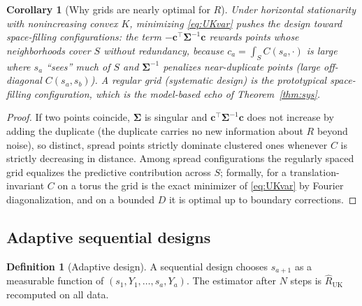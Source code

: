 \documentclass{amsart}
\newtheorem{corollary}[theorem]{Corollary}
\theoremstyle{definition}
\newtheorem{definition}[theorem]{Definition}
\newcommand{\Rhat}{\widehat R}
\begin{document}
\begin{corollary}[Why grids are nearly optimal for $R$]
Under horizontal stationarity with nonincreasing convex $K$, minimizing
\eqref{eq:UKvar} pushes the design toward \emph{space-filling}
configurations: the term $-\mathbf c^\top\boldsymbol\Sigma^{-1}\mathbf c$
rewards points whose neighborhoods cover $S$ without redundancy, because
$c_a=\int_S C(s_a,\cdot)$ is large where $s_a$ ``sees'' much of $S$ and
$\boldsymbol\Sigma^{-1}$ penalizes near-duplicate points (large
off-diagonal $C(s_a,s_b)$). A regular grid (systematic design) is the
prototypical space-filling configuration, which is the model-based echo of
Theorem~\ref{thm:sys}.
\end{corollary}
\begin{proof}
If two points coincide, $\boldsymbol\Sigma$ is singular and
$\mathbf c^\top\boldsymbol\Sigma^{-1}\mathbf c$ does not increase by adding
the duplicate (the duplicate carries no new information about $R$ beyond
noise), so distinct, spread points strictly dominate clustered ones
whenever $C$ is strictly decreasing in distance. Among spread
configurations the regularly spaced grid equalizes the predictive
contribution across $S$; formally, for a translation-invariant $C$ on a
torus the grid is the exact minimizer of \eqref{eq:UKvar} by Fourier
diagonalization, and on a bounded $D$ it is optimal up to boundary
corrections. \end{proof}

\subsection{Adaptive sequential designs}\label{ssec:adaptive}

\begin{definition}[Adaptive design]
A sequential design chooses $s_{a+1}$ as a measurable function of
$(s_1,Y_1,\dots,s_a,Y_a)$. The estimator after $N$ steps is
$\Rhat_{\mathrm{UK}}$ recomputed on all data.
\end{definition}
\end{document}
